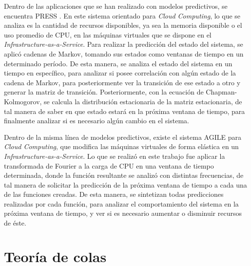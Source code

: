 Dentro de las aplicaciones que se han realizado con modelos predictivos, se encuentra PRESS \citep{GongGW10}. En este sistema orientado para \textit{Cloud Computing}, lo que se analiza es la cantidad de recursos disponibles, ya sea la memoria disponible o el uso promedio de CPU, en las máquinas virtuales que se dispone en el \textit{Infrastructure-as-a-Service}. Para realizar la predicción del estado del sistema, se aplicó cadenas de Markov, tomando sus estados como ventanas de tiempo en un determinado período. De esta manera, se analiza el estado del sistema en un tiempo en específico, para analizar si posee correlación con algún estado de la cadena de Markov, para posteriormente ver la transición de ese estado a otro y generar la matriz de transición. Posteriormente, con la ecuación de Chapman-Kolmogorov, se calcula la distribución estacionaria de la matriz estacionaria, de tal manera de saber en que estado estará en la próxima ventana de tiempo, para finalmente analizar si es necesario algún cambio en el sistema.

Dentro de la misma línea de modelos predictivos, existe el sistema AGILE \citep{NguyenSGSW13} para \textit{Cloud Computing}, que modifica las máquinas virtuales de forma elástica en un \textit{Infrastructure-as-a-Service}. Lo que se realizó en este trabajo fue aplicar la transformada de Fourier \citep{falk2012first} a la carga de CPU en una ventana de tiempo determinada, donde la función resultante se analizó con distintas frecuencias, de tal manera de solicitar la predicción de la próxima ventana de tiempo a cada una de las funciones creadas. De esta manera, se sintetizan todas predicciones realizadas por cada función, para analizar el comportamiento del sistema en la próxima ventana de tiempo, y ver si es necesario aumentar o disminuir recursos de éste.

\section{Teoría de colas}


